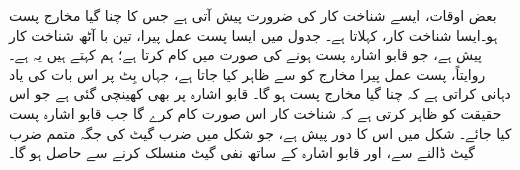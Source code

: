 بعض اوقات،  ایسے  شناخت کار کی ضرورت  پیش آتی  ہے جس کا  چنا  گیا  مخارج  پست  ہو۔ایسا شناخت کار، کہلاتا ہے۔  جدول      میں ایسا پست عمل پیرا،  تین با آٹھ شناخت کار  پیش ہے، جو  قابو اشارہ   پست   ہونے کی صورت میں    کام کرتا ہے؛ ہم کہتے ہیں  یہ    ہے۔ روایتاً،  پست عمل پیرا مخارج کو  سے ظاہر کیا جاتا ہے، جہاں بِٹ پر    اس بات کی یاد دہانی کراتی ہے کہ  چنا گیا  مخارج پست ہو گا۔ قابو اشارہ پر بھی   کھینچی گئی ہے  جو اس حقیقت کو ظاہر کرتی ہے کہ شناخت کار اس صورت کام کرے گا جب قابو اشارہ پست کیا جائے۔  شکل  میں اس کا دور پیش ہے، جو 
شکل  میں ضرب گیٹ کی جگہ متمم ضرب گیٹ  ڈالنے  سے، اور قابو اشارہ کے ساتھ نفی گیٹ منسلک کرنے سے  حاصل ہو گا۔
 
